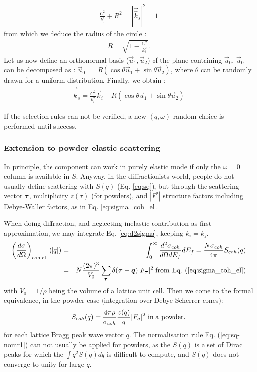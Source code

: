 \begin{align}
\frac{C^2}{k_i^2} + R^2 = |\vec{\hat k}_s|^2 = 1
\end{align}
from which we deduce the radius of the circle :
\begin{align}
R = \sqrt{1 - \frac{C^2}{k_i^2}}.
\end{align}
Let us now define an orthonormal basis ($\vec{u}_1,\vec{u}_2$) of the plane containing $\vec{u}_0$.
$\vec{u}_0$ can be decomposed as : $\vec{u}_0~=~R(\cos \theta \vec{u}_1 + \sin \theta \vec{u}_2)$, where $\theta$ can be randomly drawn for a uniform distribution.
Finally, we obtain :
\begin{align}
\vec{\hat k}_s = \frac{C^2}{k_i^2} \vec{k}_i + R (\cos \theta \vec{u}_1 + \sin \theta \vec{u}_2)
\end{align}

If the selection rules can not be verified, a new $(q,\omega)$ random choice is performed until success.

\subsubsection{Extension to powder elastic scattering}

In principle, the component can work in purely elastic mode if only the $\omega = 0$ column is available in $S$.
Anyway, in the diffractionists world, people do not usually define scattering with $S(q)$ (Eq. \ref{eq:sq}), but through the scattering vector $\boldsymbol{\tau}$, multiplicity $z(\tau)$ (for powders), and $|F^2|$ structure factors including Debye-Waller factors, as in Eq. \ref{eq:sigma_coh_el}.

When doing diffraction, and neglecting inelastic contribution as first approximation, we may integrate Eq. \ref{eq:d2sigma}, keeping $k_i = k_f$.
\begin{eqnarray}
\left(\frac{d\sigma}{d\Omega}\right)_{\rm coh.el.}(|q|) &=& \int_0^\infty \frac{d^2\sigma_{coh}}{d\Omega dE_f} dE_f = \frac{N \sigma_{coh}}{4\pi} S_{coh}(q) \\
& = & N\frac{(2\pi)^3}{V_0}\sum_{\boldsymbol{\tau}} \delta(\boldsymbol{\tau} - \boldsymbol{q})|F_{\boldsymbol{\tau}}|^2 {\rm\ from\ Eq.\ (\ref{eq:sigma_coh_el})}
\end{eqnarray}
with $V_0 = 1/\rho$ being the volume of a lattice unit cell. Then we come to the formal equivalence, in the powder case \cite{squires} (integration over Debye-Scherrer cones):
\begin{eqnarray}\label{eq:sq-F2}
S_{coh}(q) = \frac{4 \pi \rho}{\sigma_{coh}} \frac{z(q)}{q} |F_q|^2 {\rm\ in\ a\ powder.}
\end{eqnarray}
for each lattice Bragg peak wave vector $q$.
The normalisation rule Eq. (\ref{eq:sq-nomr1}) can not usually be applied for powders, as the $S(q)$ is a set of Dirac peaks for which the $\int q^2 S(q) dq$ is difficult to compute, and $S(q)$ does not converge to unity for large $q$.


